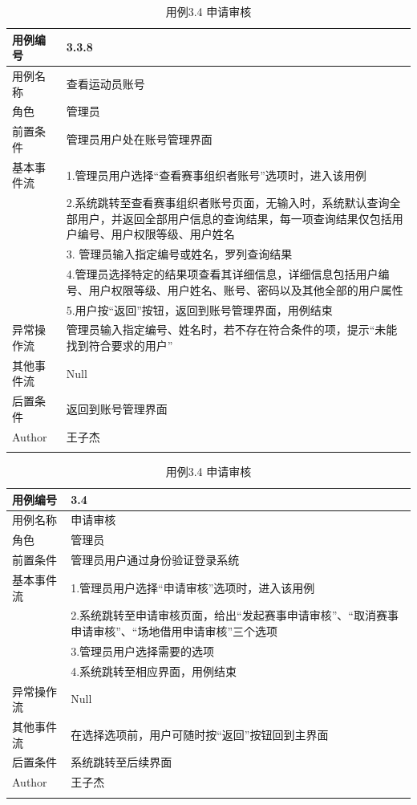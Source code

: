\documentclass[a4paper,UTF8]{article}
\begin{document}
\begin{table}[H]
	\begin{center}
		\caption{用例3.3.8 查看运动员账号}
		\label{table:Tab_uc338}
		\begin{tabular}{|p{}|p{}|}
			\hline\noalign{\smallskip}
			用例编号 & 3.3.8\\
			\hline
			用例名称 &  查看运动员账号\\
			\hline
			角色 & 管理员\\
			\hline
			前置条件 & 管理员用户处在账号管理界面 \\
			\hline
			基本事件流 & 1.管理员用户选择“查看赛事组织者账号”选项时，进入该用例 \\& 2.系统跳转至查看赛事组织者账号页面，无输入时，系统默认查询全部用户，并返回全部用户信息的查询结果，每一项查询结果仅包括用户编号、用户权限等级、用户姓名 \\ & 3. 管理员输入指定编号或姓名，罗列查询结果 \\ & 4.管理员选择特定的结果项查看其详细信息，详细信息包括用户编号、用户权限等级、用户姓名、账号、密码以及其他全部的用户属性 \\ & 5.用户按“返回”按钮，返回到账号管理界面，用例结束\\
			\hline
			异常操作流 & 管理员输入指定编号、姓名时，若不存在符合条件的项，提示“未能找到符合要求的用户” \\
			\hline
			其他事件流 & Null \\
			\hline
			后置条件 & 返回到账号管理界面 \\
			\hline
			Author & 王子杰 \\
			\noalign{\smallskip}
			\hline
			\noalign{\smallskip}
		\end{tabular}
		\caption{用例3.4 申请审核}
		\label{table:Tab_uc34}
		\begin{tabular}{|p{}|p{}|}
			\hline\noalign{\smallskip}
			用例编号 & 3.4\\
			\hline
			用例名称 &  申请审核\\
			\hline
			角色 & 管理员\\
			\hline
			前置条件 & 管理员用户通过身份验证登录系统 \\
			\hline
			基本事件流 & 1.管理员用户选择“申请审核”选项时，进入该用例 \\& 2.系统跳转至申请审核页面，给出“发起赛事申请审核”、“取消赛事申请审核”、“场地借用申请审核”三个选项 \\& 3.管理员用户选择需要的选项 \\& 4.系统跳转至相应界面，用例结束\\
			\hline
			异常操作流 & Null \\
			\hline
			其他事件流 & 在选择选项前，用户可随时按“返回”按钮回到主界面 \\
			\hline
			后置条件 & 系统跳转至后续界面 \\
			\hline
			Author & 王子杰 \\
			\noalign{\smallskip}
			\hline
			\noalign{\smallskip}
		\end{tabular}
	\end{center}
\end{table}
\end{document}
